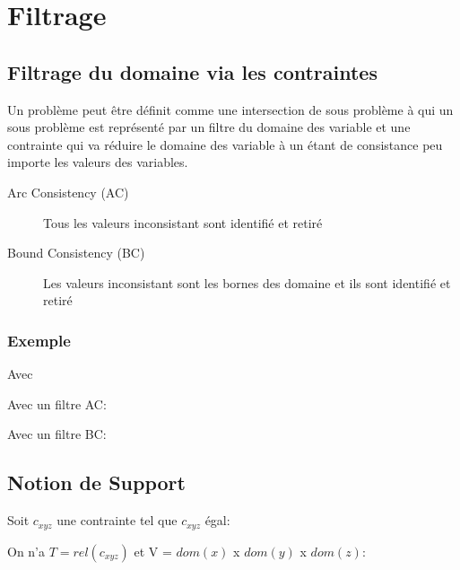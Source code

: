 \chapter{Filtrage}
\pagebreak
\section{Filtrage du domaine via les contraintes}

Un problème peut être définit comme une intersection de sous problème à qui un sous problème est représenté par un filtre du domaine des variable et une contrainte qui va réduire le domaine des variable à un étant de consistance peu importe les valeurs des variables.\\

\begin{description}
\item[Arc Consistency (AC)] Tous les valeurs inconsistant sont identifié et retiré
\item[Bound Consistency (BC)] Les valeurs inconsistant sont les bornes des domaine et ils sont identifié et retiré
\end{description}

\subsection{Exemple}

Avec

Avec un filtre AC:\\

Avec un filtre BC:\\

\pagebreak
\section{Notion de Support}
Soit $c_{xyz}$ une contrainte tel que $c_{xyz}$ égal:

On n'a $T = rel(c_{xyz})$ et V = $dom(x)$ x $dom(y)$ x $dom(z)$:\\

